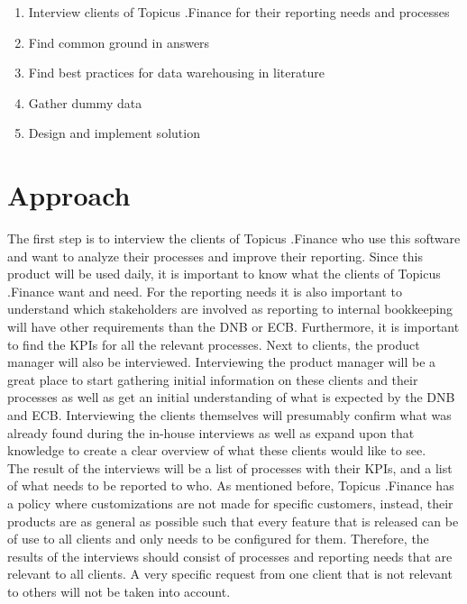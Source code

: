\documentclass[11pt]{article}
\begin{document}
\begin{enumerate}
    \item Interview clients of Topicus .Finance for their reporting needs and processes
    \item Find common ground in answers
    \item Find best practices for data warehousing in literature
    \item Gather dummy data
    \item Design and implement solution
\end{enumerate}

\section{Approach}
\label{approach}
The first step is to interview the clients of Topicus .Finance who use this software and want to analyze their processes and improve their reporting. Since this product will be used daily, it is important to know what the clients of Topicus .Finance want and need. For the reporting needs it is also important to understand which stakeholders are involved as reporting to internal bookkeeping will have other requirements than the DNB or ECB. Furthermore, it is important to find the KPIs for all the relevant processes. Next to clients, the product manager will also be interviewed. Interviewing the product manager will be a great place to start gathering initial information on these clients and their processes as well as get an initial understanding of what is expected by the DNB and ECB. Interviewing the clients themselves will presumably confirm what was already found during the in-house interviews as well as expand upon that knowledge to create a clear overview of what these clients would like to see. \\

The result of the interviews will be a list of processes with their KPIs, and a list of what needs to be reported to who. As mentioned before, Topicus .Finance has a policy where customizations are not made for specific customers, instead, their products are as general as possible such that every feature that is released can be of use to all clients and only needs to be configured for them. Therefore, the results of the interviews should consist of processes and reporting needs that are relevant to all clients. A very specific request from one client that is not relevant to others will not be taken into account. \\
\end{document}
